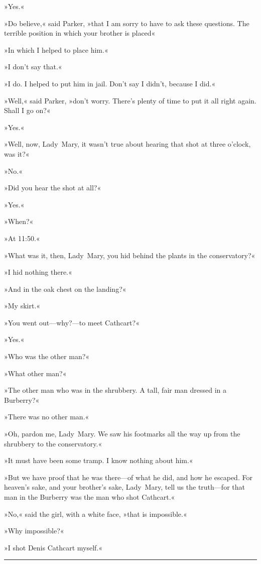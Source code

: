 »Yes.«

»Do believe,« said Parker, »that I am sorry to have to ask these questions. The terrible position in which your brother is placed\longdash«

»In which I helped to place him.«

»I don't say that.«

»I do. I helped to put him in jail. Don't say I didn't, because I did.«

»Well,« said Parker, »don't worry. There's plenty of time to put it all right again. Shall I go on?«

»Yes.«

»Well, now, Lady~Mary, it wasn't true about hearing that shot at three o'clock, was it?«

»No.«

»Did you hear the shot at all?«

»Yes.«

»When?«

»At 11:50.«

»What was it, then, Lady~Mary, you hid behind the plants in the conservatory?«

»I hid nothing there.«

»And in the oak chest on the landing?«

»My skirt.«

»You went out—why?—to meet Cathcart?«

»Yes.«

»Who was the other man?«

»What other man?«

»The other man who was in the shrubbery. A tall, fair man dressed in a Burberry?«

»There was no other man.«

»Oh, pardon me, Lady~Mary. We saw his footmarks all the way up from the shrubbery to the conservatory.«

»It must have been some tramp. I know nothing about him.«

»But we have proof that he was there—of what he did, and how he escaped. For heaven's sake, and your brother's sake, Lady~Mary, tell us the truth—for that man in the Burberry was the man who shot Cathcart.«

»No,« said the girl, with a white face, »that is impossible.«

»Why impossible?«

»I shot Denis Cathcart myself.«

\noindent\hfil\rule{0.5\textwidth}{.4pt}\hfil

